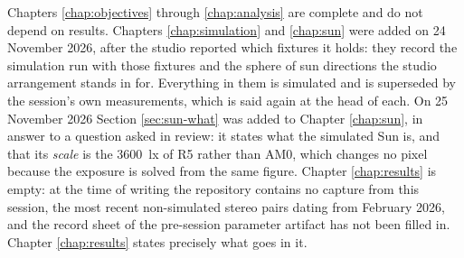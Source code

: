 Chapters \ref{chap:objectives} through \ref{chap:analysis} are complete and do
not depend on results. Chapters \ref{chap:simulation} and \ref{chap:sun} were
added on 24 November 2026, after the studio reported which fixtures it holds:
they record the simulation run with those fixtures and the sphere of sun
directions the studio arrangement stands in for. Everything in them is
simulated and is superseded by the session's own measurements, which is said
again at the head of each. On 25 November 2026 Section \ref{sec:sun-what} was
added to Chapter \ref{chap:sun}, in answer to a question asked in review: it
states what the simulated Sun is, and that its \emph{scale} is the 3600~lx of
R5 rather than AM0, which changes no pixel because the exposure is solved from
the same figure. Chapter \ref{chap:results} is empty: at the time of
writing the repository contains no capture from this session, the most recent
non-simulated stereo pairs dating from February 2026, and the record sheet of
the pre-session parameter artifact has not been filled in. Chapter
\ref{chap:results} states precisely what goes in it.
